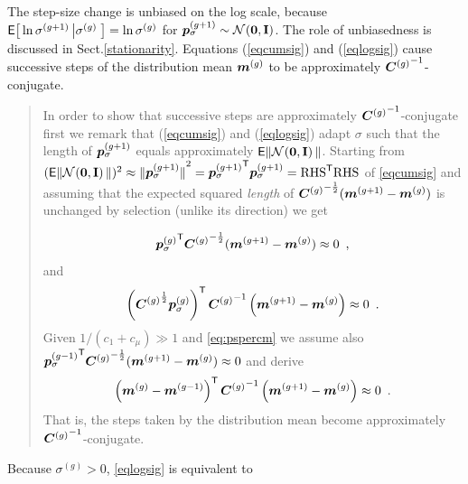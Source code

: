\documentclass{article} %
\newcommand{\bookchapter}[1]{{#1}}
\newenvironment{einschub}{%
\begin{small} \begin{quotation}\noindent}{%
  \vspace{0.5ex}\end{quotation}\end{small}%
}
\newcommand{\myframe}[1]{ %
\vspace{0.5ex}\par\noindent
      \frame{\parbox{\textwidth}{#1}}\vspace{0.2ex}
  }
\newcommand{\equationframe}[1]{\myframe{#1}}
\newcommand{\kom}[1]{}
\newcommand{\ve}[1]{\mathchoice{\mbox{\boldmath$\displaystyle#1$}}
  {\mbox{\boldmath$\textstyle#1$}} {\mbox{\boldmath$\scriptstyle#1$}}
  {\mbox{\boldmath$\scriptscriptstyle#1$}}}
\newcommand{\ma}[1]{\mathchoice{\mbox{\boldmath$\displaystyle#1$}}
  {\mbox{\boldmath$\textstyle#1$}} {\mbox{\boldmath$\scriptstyle#1$}}
  {\mbox{\boldmath$\scriptscriptstyle#1$}}}
\newcommand{\T}{\ensuremath{\mathsf{T}}}
\newcommand{\rklam}[1]{\left({#1}\right)}
\newcommand{\mueff}{\ensuremath{\mu_\mathrm{eff}}}
\newcommand{\sig}{\ensuremath{\sigma}}
\newcommand{\sigg}{\sigma^{(g)}}
\newcommand{\siggg}{\sigma^{(g+1)}}
\newcommand{\Cg}{\ensuremath{\ma{C}^{(g)}}}
\newcommand{\cs}{c_\sig}
\newcommand{\ds}{d_\sig}
\newcommand{\psgminone}{{\ve{p}_\sig^{(g-1)}}}
\newcommand{\psg}{{\ve{p}_\sig^{(g)}}}
\newcommand{\psgg}{{\ve{p}_\sig^{(g+1)}}}
\newcommand{\Id}{\mathbf{I}}
\newcommand{\NormalNullI}{{\mathcal N}
        \hspace{-0.13em}\left({\ve{0},\Id}\right)}
\newcommand{\cone}{\ensuremath{c_1}}
\newcommand{\cmu}{\ensuremath{c_\mu}}
\newcommand{\chiN}{\mathsf{E}\|\NormalNullI\|}
\newcommand{\xmean}{\ensuremath{\ve{m}}}
\newcommand{\xmeang}{\ensuremath{\xmean^{(g)}}}
\newcommand{\xmeangg}{\ensuremath{\xmean^{(g+1)}}}
\newcommand{\invsqrtC}[1]{{\ma{C}\ifthenelse{%
        \equal{#1}{}}{}{^{(#1)}}}^{-\frac{1}{2}}}
\newcommand{\sqrtC}[1]{{\ma{C}\ifthenelse{%
        \equal{#1}{}}{}{^{(#1)}}}^{\frac{1}{2}}}
\newcommand{\invC}[1]{{\ma{C}^{(#1)}}^{-{1}}}
\newcommand{\pref}[1]{\mbox{.\hspace{0.235em}\ref{#1}}}
\newcommand{\eqrefadd}[1]{(\ref{#1})} %
\newcommand{\eqsref}[1]{(\ref{#1})}
\newcommand{\Eqsref}[1]{Equations (\ref{#1})}
\newcommand{\Extext}[1]{{\mathsf{E}}\hspace{-0.0em}\big[#1\big]}
\begin{document}
 The step-size change is unbiased on the log scale,
because $\Extext{\ln\siggg\left|\sigg\right.} = \ln\sigg$ for
$\psgg\sim\NormalNullI$. The role of unbiasedness is discussed in
Sect\pref{stationarity}. \Eqsref{eqcumsig} and \eqrefadd{eqlogsig}
cause successive steps of the distribution mean $\xmeang$ to be
approximately $\invC{g}$-conjugate.
%
\begin{einschub}
\begin{sloppypar}\noindent
  In order to show that successive steps are approximately $\invC{g}$-conjugate
  first we remark that \eqsref{eqcumsig} and \eqrefadd{eqlogsig} adapt
  $\sig$ such that the length of $\psgg$ equals approximately $\chiN$.
  Starting from $(\chiN)^2 \approx {\|{\psgg}\|}^2=
  {{\psgg^{\T}\psgg}}={\mathrm{RHS}^\T\mathrm{RHS}}$ of
  \eqref{eqcumsig} and assuming that the expected squared \emph{length} of
  $\invsqrtC{g}(\xmeangg-\xmeang)$ is unchanged by selection (unlike its direction) we get
\end{sloppypar}
\begin{equation}
  \label{eq:pspercm}
   {\psg^{\T}\invsqrtC{g}(\xmeangg-\xmeang)}\approx0\enspace, 
\end{equation}
and\kom{ transforming
$\psg$ into the given coordinate system yields}
%
\begin{equation}
  \label{eq:ppercm}
  {\rklam{\sqrtC{g}\psg}^\T\invC{g}\rklam{\xmeangg-\xmeang}}\approx 0 \enspace. 
\end{equation}%
%
%
%
Given $1/(\cone+\cmu)\gg1$ and \eqref{eq:pspercm} we assume also
${\psgminone^{\T}\invsqrtC{g}(\xmeangg-\xmeang)}\approx0$ and derive
%
  \begin{equation}
      {\rklam{\xmeang-\xmean^{(g-1)}}^\T
      {{\Cg}^{-1}\rklam{\xmeangg-\xmeang}}} \approx 0 \enspace.
  \end{equation}
  That is, the steps taken by the
  \bookchapter{distribution} mean become
  approximately ${\Cg}^{-1}$-conjugate.
\end{einschub}
%
Because $\sigg>0$, \eqref{eqlogsig} is equivalent to 
%
\equationframe{{
\begin{equation}\label{eqsig}
{\siggg = \sigg
  \exp\rklam{\frac{\cs}{\ds}\rklam{\frac{\|\psgg\|}{\chiN}-1}}} 
\end{equation}
}}
%
\kom{The length of the evolution path is an intuitive and
  empirically well validated concept for an approximate optimality
  measure for the overall step length.  For $\mueff>1$ it is the best
  measure to our knowledge. Nevertheless, it fails to adapt nearly
  optimal step-sizes on very noisy objective functions
  \cite{Beyer:2003}.  }
\end{document}
